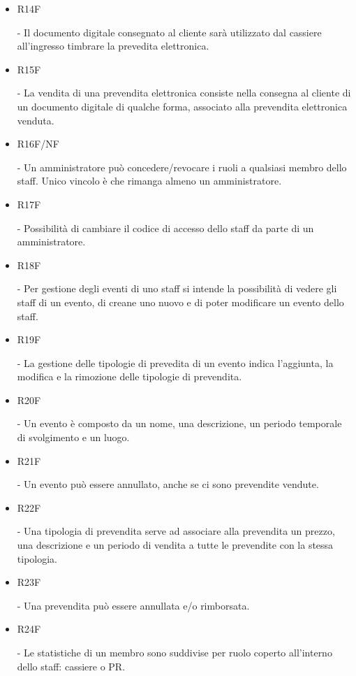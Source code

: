 \documentclass[a4paper]{article}
\begin{document}
\begin{itemize}
	\item \hypertarget{R14F}{R14F} - Il documento digitale consegnato al cliente sarà utilizzato dal cassiere all'ingresso timbrare la prevedita elettronica.
	
	\item \hypertarget{R15F}{R15F} - La vendita di una prevendita elettronica consiste nella consegna al cliente di un documento digitale di qualche forma, associato alla prevendita elettronica venduta.
	
	\item \hypertarget{R16F/NF}{R16F/NF} - Un amministratore può concedere/revocare i ruoli a qualsiasi membro dello staff. Unico vincolo è che rimanga almeno un amministratore.
	\item \hypertarget{R17F}{R17F} - Possibilità di cambiare il codice di accesso dello staff da parte di un amministratore.
	   
	\item \hypertarget{R18F}{R18F} - Per gestione degli eventi di uno staff si intende la possibilità di vedere gli staff di un evento, di creane uno nuovo e di poter modificare un evento dello staff.
		
	\item \hypertarget{R19F}{R19F} - La gestione delle tipologie di prevedita di un evento indica l'aggiunta, la modifica e la rimozione delle tipologie di prevendita.
	
	\item \hypertarget{R20F}{R20F} - Un evento è composto da un nome, una descrizione, un periodo temporale di svolgimento e un luogo. 
	\item \hypertarget{R21F}{R21F} - Un evento può essere annullato, anche se ci sono prevendite vendute.
	
	\item \hypertarget{R22F}{R22F} - Una tipologia di prevendita serve ad associare alla prevendita un prezzo, una descrizione e un periodo di vendita a tutte le prevendite con la stessa tipologia.

	\item \hypertarget{R23F}{R23F} - Una prevendita può essere annullata e/o rimborsata. 
	
	\item \hypertarget{R24F}{R24F} - Le statistiche di un membro sono suddivise per ruolo coperto all'interno dello staff: cassiere o PR.
	

\end{itemize}
\end{document}
